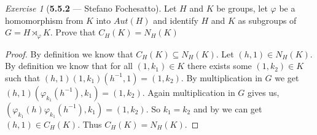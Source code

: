 \documentclass[12pt]{amsart}
\theoremstyle{remark}
\newtheorem*{exercise}{Exercise}%
\theoremstyle{mycomment}
\begin{document}
\begin{exercise}[\textbf{5.5.2} --- Stefano Fochesatto] Let $H$ and $K$ be groups, let $\varphi$ be a homomorphism from $K$ into $Aut(H)$ and identify $H$ and $K$ as subgroups of $G = H\rtimes_{\varphi} K$. Prove that $C_H(K) = N_H(K)$
  \begin{proof} 
    By definition we know that $C_H(K) \subseteq N_H(K)$. Let $(h, 1) \in N_H(K)$. By definition we know that for all $(1, k_1) \in K$ there exists some $(1, k_2) \in K$ such that $(h,1)(1,k_1)(h^{-1},1) = (1,k_2)$. By multiplication in $G$ we get $(h,1)(\varphi_{k_1}(h^{-1}), k_1) = (1,k_2)$. Again multiplication in $G$ gives us, $(\varphi_{k_1}(h)\varphi_{k_1}(h^{-1}), k_1) = (1,k_2)$. So $k_1 = k_2$ and by we can get $(h, 1) \in C_H(K)$. Thus $C_H(K) = N_H(K)$.
  \end{proof}
\end{exercise}
\vspace{.15in}
\end{document}
